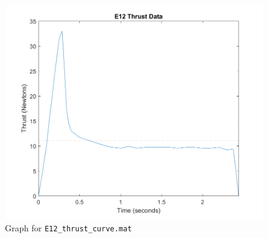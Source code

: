 \documentclass[11pt]{article}
\begin{document}
\begin{figure}
    \centering
    \includegraphics{e12.png}
    \caption{Graph for \texttt{E12\_thrust\_curve.mat}}
    \label{fig:e12}
\end{figure}
\end{document}
